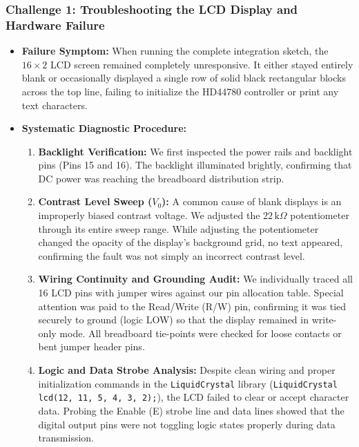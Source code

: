 \documentclass[journal,12pt,onecolumn]{IEEEtran}
\begin{document}
\begin{enumerate}
\subsubsection*{Challenge 1: Troubleshooting the LCD Display and Hardware Failure}

\begin{itemize}
	\item \textbf{Failure Symptom:} When running the complete integration sketch, the $16\times2$ LCD screen remained completely unresponsive. It either stayed entirely blank or occasionally displayed a single row of solid black rectangular blocks across the top line, failing to initialize the HD44780 controller or print any text characters.
	
	\item \textbf{Systematic Diagnostic Procedure:}
	\begin{enumerate}
		\item \textbf{Backlight Verification:} We first inspected the power rails and backlight pins (Pins 15 and 16). The backlight illuminated brightly, confirming that DC power was reaching the breadboard distribution strip.
		
		\item \textbf{Contrast Level Sweep ($V_0$):} A common cause of blank displays is an improperly biased contrast voltage. We adjusted the $22\,\text{k}\Omega$ potentiometer through its entire sweep range. While adjusting the potentiometer changed the opacity of the display's background grid, no text appeared, confirming the fault was not simply an incorrect contrast level.
		
		\item \textbf{Wiring Continuity and Grounding Audit:} We individually traced all 16 LCD pins with jumper wires against our pin allocation table. Special attention was paid to the Read/Write (R/W) pin, confirming it was tied securely to ground (logic LOW) so that the display remained in write-only mode. All breadboard tie-points were checked for loose contacts or bent jumper header pins.
		
		\item \textbf{Logic and Data Strobe Analysis:} Despite clean wiring and proper initialization commands in the \texttt{LiquidCrystal} library (\texttt{LiquidCrystal lcd(12, 11, 5, 4, 3, 2);}), the LCD failed to clear or accept character data. Probing the Enable (E) strobe line and data lines showed that the digital output pins were not toggling logic states properly during data transmission.
		

\end{enumerate}
\end{itemize}
\end{enumerate}
\end{document}
